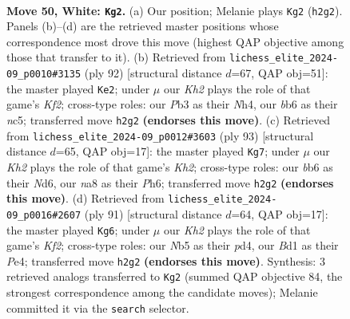\documentclass[11pt]{article}
\begin{document}
\clearpage

\begin{figure}[p]\centering
\begin{subfigure}{0.46\textwidth}\centering
\resizebox{\linewidth}{!}{%
\newchessgame
\chessboard[
  setfen={nnb5/1p4k1/1b6/pN1p2p1/7p/PP2P2P/3BP2K/3B4 w - - 12 50},
  showmover=false,
  pgfstyle=straightmove, color=movearrow, markmove={h2-g2}
]}
\caption{}
\end{subfigure}\hfill
\begin{subfigure}{0.46\textwidth}\centering
\resizebox{\linewidth}{!}{%
\newchessgame
\chessboard[
  setfen={5k2/2pb4/5p2/2n1pP2/p1PpP2N/P2P4/2B2K2/8 w - - 1 47},
  showmover=false,
  pgfstyle=straightmove, color=movearrow, markmove={f2-e2}
]}
\caption{}
\end{subfigure}
\\[4pt]
\begin{subfigure}{0.46\textwidth}\centering
\resizebox{\linewidth}{!}{%
\newchessgame
\chessboard[
  setfen={8/7k/3n1p1p/p2P3P/P1p2P2/1pN5/1Pb1B1P1/6K1 b - - 0 47},
  showmover=false,
  pgfstyle=straightmove, color=movearrow, markmove={h7-g7}
]}
\caption{}
\end{subfigure}\hfill
\begin{subfigure}{0.46\textwidth}\centering
\resizebox{\linewidth}{!}{%
\newchessgame
\chessboard[
  setfen={8/1p3k2/p1pb3P/P5B1/1P1Ppp1K/2P5/5n2/4N3 b - - 4 46},
  showmover=false,
  pgfstyle=straightmove, color=movearrow, markmove={f7-g6}
]}
\caption{}
\end{subfigure}
\caption{\textbf{Move 50, White: \texttt{Kg2}.} (a) Our position; Melanie plays \texttt{Kg2} (\texttt{h2g2}). Panels (b)--(d) are the retrieved master positions whose correspondence most drove this move (highest QAP objective among those that transfer to it). (b) Retrieved from \texttt{lichess\_elite\_2024-09\_p0010\#3135} (ply 92) [structural distance $d$=67, QAP obj=51]: the master played \texttt{Ke2}; under $\mu$ our \emph{Kh2} plays the role of that game's \emph{Kf2}; cross-type roles: our \emph{P}b3 as their \emph{N}h4, our \emph{b}b6 as their \emph{n}c5; transferred move \texttt{h2g2} \textbf{(endorses this move)}. (c) Retrieved from \texttt{lichess\_elite\_2024-09\_p0012\#3603} (ply 93) [structural distance $d$=65, QAP obj=17]: the master played \texttt{Kg7}; under $\mu$ our \emph{Kh2} plays the role of that game's \emph{Kh2}; cross-type roles: our \emph{b}b6 as their \emph{N}d6, our \emph{n}a8 as their \emph{P}h6; transferred move \texttt{h2g2} \textbf{(endorses this move)}. (d) Retrieved from \texttt{lichess\_elite\_2024-09\_p0016\#2607} (ply 91) [structural distance $d$=64, QAP obj=17]: the master played \texttt{Kg6}; under $\mu$ our \emph{Kh2} plays the role of that game's \emph{Kf2}; cross-type roles: our \emph{N}b5 as their \emph{p}d4, our \emph{B}d1 as their \emph{P}e4; transferred move \texttt{h2g2} \textbf{(endorses this move)}. Synthesis: 3 retrieved analogs transferred to \texttt{Kg2} (summed QAP objective 84, the strongest correspondence among the candidate moves); Melanie committed it via the \texttt{search} selector.}
\label{fig:thought-m98}
\end{figure}
\end{document}
